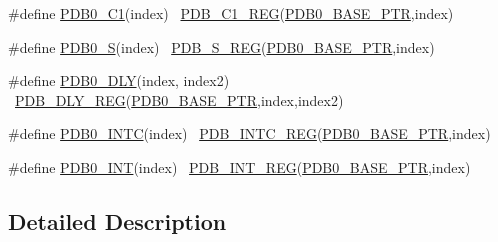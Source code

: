 \begin{DoxyCompactItemize}
\#define \hyperlink{group___p_d_b___register___accessor___macros_ga8e7367fe725a0cdee10a8e85cd5bc953}{P\+D\+B0\+\_\+\+C1}(index)                                                  ~\hyperlink{group___p_d_b___register___accessor___macros_ga5786cd17977be8e085fe0157ec4c15fe}{P\+D\+B\+\_\+\+C1\+\_\+\+R\+EG}(\hyperlink{group___p_d_b___peripheral_ga8e197b7c43fd7a0bf1a38caa1918b7b5}{P\+D\+B0\+\_\+\+B\+A\+S\+E\+\_\+\+P\+TR},index)
\item 
\#define \hyperlink{group___p_d_b___register___accessor___macros_ga38419061234f7d51e3609f0675d4d389}{P\+D\+B0\+\_\+S}(index)                                                    ~\hyperlink{group___p_d_b___register___accessor___macros_gacae2553354248e45352a2dbee463e62d}{P\+D\+B\+\_\+\+S\+\_\+\+R\+EG}(\hyperlink{group___p_d_b___peripheral_ga8e197b7c43fd7a0bf1a38caa1918b7b5}{P\+D\+B0\+\_\+\+B\+A\+S\+E\+\_\+\+P\+TR},index)
\item 
\#define \hyperlink{group___p_d_b___register___accessor___macros_ga06f990bbf5fefa38e0869222b149b921}{P\+D\+B0\+\_\+\+D\+LY}(index,  index2)                                  ~\hyperlink{group___p_d_b___register___accessor___macros_ga2b72a7c3b1604a38397358fd0b271851}{P\+D\+B\+\_\+\+D\+L\+Y\+\_\+\+R\+EG}(\hyperlink{group___p_d_b___peripheral_ga8e197b7c43fd7a0bf1a38caa1918b7b5}{P\+D\+B0\+\_\+\+B\+A\+S\+E\+\_\+\+P\+TR},index,index2)
\item 
\#define \hyperlink{group___p_d_b___register___accessor___macros_ga499b47f8a74429ad40337dcc6afbd15b}{P\+D\+B0\+\_\+\+I\+N\+TC}(index)                                              ~\hyperlink{group___p_d_b___register___accessor___macros_ga872dcab8e3d15a466c56e2f7fb3d33e2}{P\+D\+B\+\_\+\+I\+N\+T\+C\+\_\+\+R\+EG}(\hyperlink{group___p_d_b___peripheral_ga8e197b7c43fd7a0bf1a38caa1918b7b5}{P\+D\+B0\+\_\+\+B\+A\+S\+E\+\_\+\+P\+TR},index)
\item 
\#define \hyperlink{group___p_d_b___register___accessor___macros_gaa8334646c20ab13a2415dc68012435ce}{P\+D\+B0\+\_\+\+I\+NT}(index)                                                ~\hyperlink{group___p_d_b___register___accessor___macros_ga7d45f442e722e2b7ba35b2bff6fafac9}{P\+D\+B\+\_\+\+I\+N\+T\+\_\+\+R\+EG}(\hyperlink{group___p_d_b___peripheral_ga8e197b7c43fd7a0bf1a38caa1918b7b5}{P\+D\+B0\+\_\+\+B\+A\+S\+E\+\_\+\+P\+TR},index)
\end{DoxyCompactItemize}


\subsection{Detailed Description}


